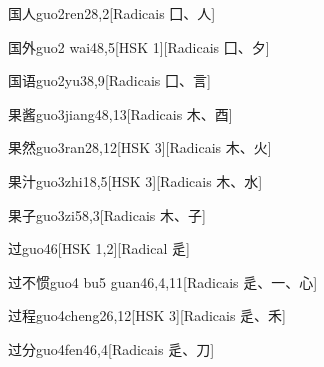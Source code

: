 \begin{entry}{国人}{guo2ren2}{8,2}[Radicais ⼞、⼈]
\end{entry}

\begin{entry}{国外}{guo2 wai4}{8,5}[HSK 1][Radicais ⼞、⼣]
\end{entry}

\begin{entry}{国语}{guo2yu3}{8,9}[Radicais ⼞、⾔]
\end{entry}

\begin{entry}{果酱}{guo3jiang4}{8,13}[Radicais ⽊、⾣]
\end{entry}

\begin{entry}{果然}{guo3ran2}{8,12}[HSK 3][Radicais ⽊、⽕]
\end{entry}

\begin{entry}{果汁}{guo3zhi1}{8,5}[HSK 3][Radicais ⽊、⽔]
\end{entry}

\begin{entry}{果子}{guo3zi5}{8,3}[Radicais ⽊、⼦]
\end{entry}

\begin{entry}{过}{guo4}{6}[HSK 1,2][Radical ⾡]
\end{entry}

\begin{entry}{过不惯}{guo4 bu5 guan4}{6,4,11}[Radicais ⾡、⼀、⼼]
\end{entry}

\begin{entry}{过程}{guo4cheng2}{6,12}[HSK 3][Radicais ⾡、⽲]
\end{entry}

\begin{entry}{过分}{guo4fen4}{6,4}[Radicais ⾡、⼑]
\end{entry}

